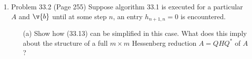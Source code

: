 \documentclass[11pt]{article}
\begin{document}
\begin{enumerate}
\begin{proof}
            Now assume that $\v{x} \in \null(A)$, that is $A\v{x} = \v{0}$.
            \begin{align*}
                A\v{x} &= \v{0} \\
                U\Sigma V* \v{x} &= \v{0} \\
                U^*U\Sigma V* \v{x} &= U^*\v{0} \\
                \Sigma V* \v{x} &= \v{0} \\
                \begin{bmatrix}
                    \sigma_1 \v{v}_1^* \v{x} \\
                    \cdots \\
                    \sigma_r \v{v}_r^* \v{x} \\
                    \sigma_{r+1} \v{v}_{r+1}^* \v{x} \\
                    \cdots \\
                    \sigma_m \v{v}_m^* \v{x}
                \end{bmatrix}
                &= \v{0}
                \intertext{Since $\sigma_i = 0$ for $r + 1 \le i \le m$}
                \begin{bmatrix}
                    \sigma_1 \v{v}_1^* \v{x} \\
                    \cdots \\
                    \sigma_r \v{v}_r^* \v{x} \\
                    0
                    \cdots \\
                    0
                \end{bmatrix}
                &= \v{0}
            \end{align*}
            This implies that $\v{v}_i^* \v{x} = 0$ for $1 \le i \le r$ since
            $\sigma_i > 0$ for $1 \le i \le r$.
            This is equivalent to $\v{x} \perp \v{v}_i$ for $1 \le i \le r$.
            Hence $\v{x} \in \langle \v{v}_1, \cdots, \v{v}_r \rangle^{\perp}$.
            Since $V$ is unitary
            \[
                \langle \v{v}_1, \cdots, \v{v}_r \rangle^{\perp} = \langle\v{v}_{r+1}, \ldots, \v{v}_m\rangle
            \]
            Thus $\v{x} \in \langle\v{v}_{r+1}, \ldots, \v{v}_m\rangle$.
        \end{proof}

    \item %
        Problem 33.2 (Page 255) 
        Suppose algorithm 33.1 is executed for a particular $A$ and $\v{b}$
        until at some step $n$, an entry $h_{n+1, n} = 0$ is encountered.
        \begin{enumerate}
            \item[(a)]
                Show how (33.13) can be simplified in this case.
                What does this imply about the structure of a full $m \times m$
                Hessenberg reduction $A = QHQ^*$ of $A$?


\end{enumerate}
\end{enumerate}
\end{document}
